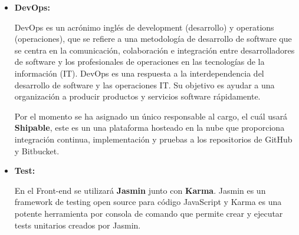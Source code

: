 \begin{itemize}
    \item \textbf{DevOps:}
    
    DevOps es un acrónimo inglés de development (desarrollo) y operations (operaciones), que se refiere a una metodología de desarrollo de software que se centra en la comunicación, colaboración e integración entre desarrolladores de software y los profesionales de operaciones en las tecnologías de la información (IT). DevOps es una respuesta a la interdependencia del desarrollo de software y las operaciones IT. Su objetivo es ayudar a una organización a producir productos y servicios software rápidamente.
    
    Por el momento se ha asignado un único responsable al cargo, el cuál usará \textbf{Shipable}, este es un una plataforma hosteado en la nube que proporciona integración continua, implementación y pruebas a los repositorios de GitHub y Bitbucket.
    
    \item \textbf{Test:}
    
    En el Front-end se utilizará \textbf{Jasmin} junto con \textbf{Karma}. Jasmin es un framework de testing open source para código JavaScript y Karma es una potente herramienta por consola de comando que permite crear y ejecutar tests unitarios creados por Jasmin. 
    
\end{itemize}



